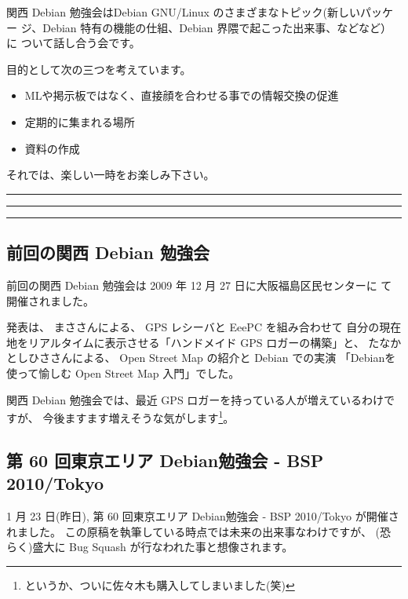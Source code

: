 \documentclass[mingoth,a4paper]{jsarticle}
\begin{document}
関西 Debian 勉強会はDebian GNU/Linux のさまざまなトピック(新しいパッケー
ジ、Debian 特有の機能の仕組、Debian 界隈で起こった出来事、などなど）に
ついて話し合う会です。

目的として次の三つを考えています。
\begin{itemize}
      \item MLや掲示板ではなく、直接顔を合わせる事での情報交換の促進
      \item 定期的に集まれる場所
      \item 資料の作成
\end{itemize}

それでは、楽しい一時をお楽しみ下さい。

\clearpage

\begin{minipage}[b]{0.2\hsize}
 {}
\end{minipage}
\begin{minipage}[b]{0.8\hsize}
\hrule
\vspace{2mm}
\hrule
\setcounter{tocdepth}{1}
\tableofcontents
\vspace{2mm}
\hrule
\end{minipage}


\subsection{前回の関西 Debian 勉強会}

前回の関西 Debian 勉強会は 2009 年 12 月 27 日に大阪福島区民センターに
て開催されました。

発表は、
まささんによる、
GPS レシーバと EeePC を組み合わせて
自分の現在地をリアルタイムに表示させる「ハンドメイド GPS ロガーの構築」と、
%
たなかとしひささんによる、
Open Street Map の紹介と Debian での実演
「Debianを使って愉しむ Open Street Map 入門」でした。

関西 Debian 勉強会では、最近 GPS ロガーを持っている人が増えているわけですが、
今後ますます増えそうな気がします\footnote{%
というか、ついに佐々木も購入してしまいました(笑)}。%

\subsection{第 60 回東京エリア Debian勉強会 - BSP 2010/Tokyo}

1 月 23 日(昨日), 
第 60 回東京エリア Debian勉強会 - BSP 2010/Tokyo が開催されました。
この原稿を執筆している時点では未来の出来事なわけですが、
(恐らく)盛大に Bug Squash が行なわれた事と想像されます。
\end{document}
